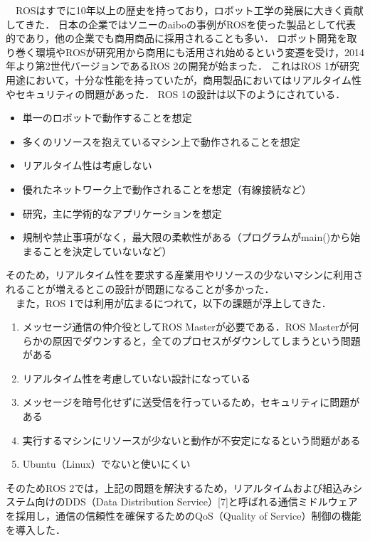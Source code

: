 　ROSはすでに10年以上の歴史を持っており，ロボット工学の発展に大きく貢献してきた．
日本の企業ではソニーのaiboの事例がROSを使った製品として代表的であり，他の企業でも商用商品に採用されることも多い．
ロボット開発を取り巻く環境やROSが研究用から商用にも活用され始めるという変遷を受け，2014年より第2世代バージョンであるROS 2の開発が始まった．
これはROS 1が研究用途において，十分な性能を持っていたが，商用製品においてはリアルタイム性やセキュリティの問題があった．
ROS 1の設計は以下のようにされている．
    \begin{itemize}
        \item 単一のロボットで動作することを想定
        \item 多くのリソースを抱えているマシン上で動作されることを想定
        \item リアルタイム性は考慮しない
        \item 優れたネットワーク上で動作されることを想定（有線接続など）
        \item 研究，主に学術的なアプリケーションを想定
        \item 規制や禁止事項がなく，最大限の柔軟性がある（プログラムがmain()から始まることを決定していないなど）
    \end{itemize}
そのため，リアルタイム性を要求する産業用やリソースの少ないマシンに利用されることが増えるとこの設計が問題になることが多かった．
\\　また，ROS 1では利用が広まるにつれて，以下の課題が浮上してきた．
   \begin{enumerate}
       \item メッセージ通信の仲介役としてROS Masterが必要である．ROS Masterが何らかの原因でダウンすると，全てのプロセスがダウンしてしまうという問題がある
       \item リアルタイム性を考慮していない設計になっている
       \item メッセージを暗号化せずに送受信を行っているため，セキュリティに問題がある
       \item 実行するマシンにリソースが少ないと動作が不安定になるという問題がある
       \item Ubuntu（Linux）でないと使いにくい
   \end{enumerate}
そのためROS 2では，上記の問題を解決するため，リアルタイムおよび組込みシステム向けのDDS（Data Distribution Service）[7]と呼ばれる通信ミドルウェアを採用し，通信の信頼性を確保するためのQoS（Quality of Service）制御の機能を導入した．
